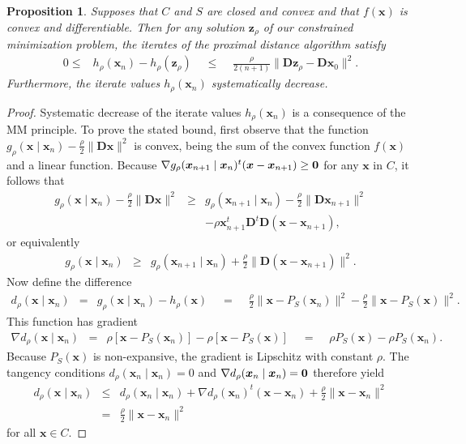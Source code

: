 \documentclass[11pt]{article}
\newtheorem{proposition}{Proposition}[section]
\def\amp{\mathop{\;\:}\nolimits}
\newcommand{\bx}{\boldsymbol{x}}
\newcommand{\bz}{\boldsymbol{z}}
\newcommand{\bD}{\boldsymbol{D}}
\begin{document}
\begin{proposition}
Supposes that $C$ and $S$ are closed and convex and that $f(\bx)$
is convex and differentiable. Then for any solution $\bz_\rho$ 
of our constrained minimization problem, the iterates of the
proximal distance algorithm satisfy  
\begin{eqnarray*}
0 \le & h_{\rho}(\bx_n) - h_\rho(\bz_\rho) \amp \le \amp
\frac{\rho}{2(n+1)} \|\bD\bz_\rho-\bD\bx_0 \|^2.
\end{eqnarray*}
Furthermore, the iterate values $h_\rho(\bx_n)$ systematically
decrease.
\end{proposition}
\begin{proof}
Systematic decrease of the iterate values $h_\rho(\bx_n)$
is a consequence of the MM principle. To prove the stated bound,
first observe that the function 
$g_\rho(\bx \mid \bx_n)-\frac{\rho}{2}\|\bD\bx\|^2$ is convex, being 
the sum of the convex function $f(\bx)$ and a linear function. Because
$\nabla g_\rho(\bx_{n+1} \mid \bx_n)^t(\bx-\bx_{n+1}) \ge \bf 0$ for any $\bx$ in $C$, it follows that
\begin{eqnarray*}
g_{\rho}(\bx \mid \bx_n)-\frac{\rho}{2}\|\bD\bx\|^2
& \ge & g_{\rho}(\bx_{n+1} \mid \bx_n)-\frac{\rho}{2} 
\|\bD\bx_{n+1}\|^2 \\
&  & -\rho \bx_{n+1}^t\bD^t\bD(\bx-\bx_{n+1}) ,
\end{eqnarray*}
or equivalently
\begin{eqnarray}
g_{\rho}(\bx \mid \bx_n) & \ge & g_{\rho}(\bx_{n+1} \mid \bx_n) 
+ \frac{\rho}{2}\|\bD(\bx-\bx_{n+1})\|^2. \label{error_bd1}
\end{eqnarray}
Now define the difference
\begin{eqnarray*}
d_{\rho}(\bx \mid \bx_n) & \!=\! & g_{\rho}(\bx \mid \bx_n)-h_{\rho}(\bx) 
\amp = \amp \frac{\rho}{2} \|\bx-P_S(\bx_n)\|^2 
-\frac{\rho}{2}\|\bx -P_S(\bx)\|^2.
\end{eqnarray*}
This function has gradient
\begin{eqnarray*}
\nabla d_\rho(\bx \mid \bx_n) & = & \rho [\bx-P_S(\bx_n)] -\rho [\bx -P_S(\bx)]
 \amp = \amp \rho P_S(\bx) - \rho P_S(\bx_n).
\end{eqnarray*}
Because $P_S(\bx)$ is non-expansive, the gradient is Lipschitz with constant $\rho$. The tangency conditions $d_\rho(\bx_n \mid \bx_n)=0$ and $\nabla d_\rho(\bx_n \mid \bx_n)= {\bf 0}$ therefore yield 
\begin{eqnarray}
d_\rho(\bx \mid \bx_n ) & \le & d_\rho(\bx_n \mid \bx_n) +
 \nabla d_\rho(\bx_n)^t(\bx-\bx_n) +\frac{\rho}{2}\|\bx-\bx_{n}\|^2 \label{error_bd2}\\
& = &\frac{\rho}{2}\|\bx-\bx_{n}\|^2 \nonumber
\end{eqnarray}
for all $\bx \in C$.


\end{proof}
\end{document}

